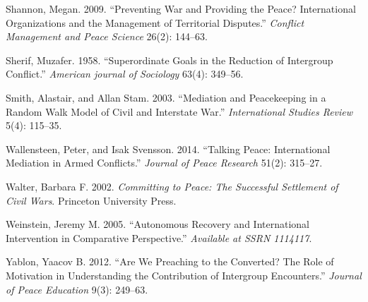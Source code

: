 \documentclass[11pt]{article}
\begin{document}
\hypertarget{ref-shannon2009preventing}{}
Shannon, Megan. 2009. ``Preventing War and Providing the Peace?
International Organizations and the Management of Territorial
Disputes.'' \emph{Conflict Management and Peace Science} 26(2): 144--63.

\hypertarget{ref-sherif1958superordinate}{}
Sherif, Muzafer. 1958. ``Superordinate Goals in the Reduction of
Intergroup Conflict.'' \emph{American journal of Sociology} 63(4):
349--56.

\hypertarget{ref-smith2003mediation}{}
Smith, Alastair, and Allan Stam. 2003. ``Mediation and Peacekeeping in a
Random Walk Model of Civil and Interstate War.'' \emph{International
Studies Review} 5(4): 115--35.

\hypertarget{ref-wallensteen2014talking}{}
Wallensteen, Peter, and Isak Svensson. 2014. ``Talking Peace:
International Mediation in Armed Conflicts.'' \emph{Journal of Peace
Research} 51(2): 315--27.

\hypertarget{ref-walter2002committing}{}
Walter, Barbara F. 2002. \emph{Committing to Peace: The Successful
Settlement of Civil Wars}. Princeton University Press.

\hypertarget{ref-weinstein2005autonomous}{}
Weinstein, Jeremy M. 2005. ``Autonomous Recovery and International
Intervention in Comparative Perspective.'' \emph{Available at SSRN
1114117}.

\hypertarget{ref-yablon2012we}{}
Yablon, Yaacov B. 2012. ``Are We Preaching to the Converted? The Role of
Motivation in Understanding the Contribution of Intergroup Encounters.''
\emph{Journal of Peace Education} 9(3): 249--63.
\end{document}
